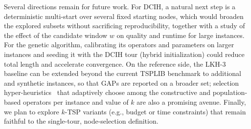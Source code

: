 \documentclass[conference]{IEEEtran}
\begin{document}
Several directions remain for future work. For DCIH, a natural next step is a deterministic multi-start over several fixed starting nodes, which would broaden the explored subsets without sacrificing reproducibility, together with a study of the effect of the candidate window $w$ on quality and runtime for large instances. For the genetic algorithm, calibrating its operators and parameters on larger instances and seeding it with the DCIH tour (hybrid initialization) could reduce total length and accelerate convergence. On the reference side, the LKH-3 baseline can be extended beyond the current TSPLIB benchmark to additional and synthetic instances, so that GAPs are reported on a broader set; selection hyper-heuristics~\cite{drake2020hyper} that adaptively choose among the constructive and population-based operators per instance and value of $k$ are also a promising avenue. Finally, we plan to explore $k$-TSP variants (e.g., budget or time constraints) that remain faithful to the single-tour, node-selection definition.

\end{document}
